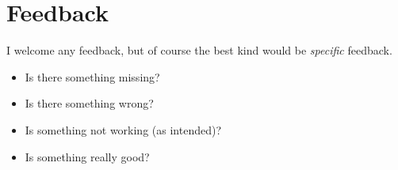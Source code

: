 \section{Feedback}
\label{sec:feedback}

I welcome any feedback, but of course the best kind would be \emph{specific} feedback.
\begin{itemize}
	\item Is there something missing?
	\item Is there something wrong?
	\item Is something not working (as intended)?
	\item Is something really good?
\end{itemize}

